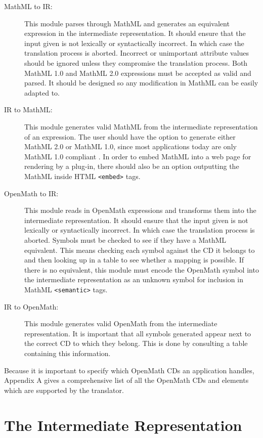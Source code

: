 \begin{description}

\item[MathML to IR:] This module parses through MathML and generates an equivalent expression in the intermediate representation. It should ensure
that the input given is not lexically or syntactically incorrect. In which case the translation process is aborted. Incorrect or unimportant
attribute values should be ignored unless they compromise the translation process. Both MathML 1.0 and MathML 2.0 expressions must be accepted as
valid and parsed. It should be designed so any modification in MathML can be easily adapted to.

\item[IR to MathML:] This module generates valid MathML from the intermediate representation of an expression. The user should have the option to
generate either MathML 2.0 or MathML 1.0, since most applications today are only MathML 1.0 compliant . In order to embed MathML into a web page
for rendering by a plug-in, there should also be an option outputting the MathML inside HTML \verb|<embed>| tags.

\item[OpenMath to IR:] This module reads in OpenMath expressions and transforms them into the intermediate representation. It should ensure that
the input given is not lexically or syntactically incorrect. In which case the translation process is aborted. Symbols must be checked to see if
they have a MathML equivalent. This means checking each symbol against the CD it belongs to and then looking up in a table to see whether a mapping
is possible. If there is no equivalent, this module must encode the OpenMath symbol into the intermediate representation as an unknown symbol for
inclusion in MathML \verb|<semantic>| tags.

\item[IR to OpenMath:] This module generates valid OpenMath from the intermediate representation. It is important that all symbols generated appear
next to the correct CD to which they belong. This is done by consulting a table containing this information.

\end{description}

Because it is important to specify which OpenMath CDs an application handles, Appendix A gives a comprehensive list of all the OpenMath CDs and
elements which are supported by the translator.

\section{The Intermediate Representation}

